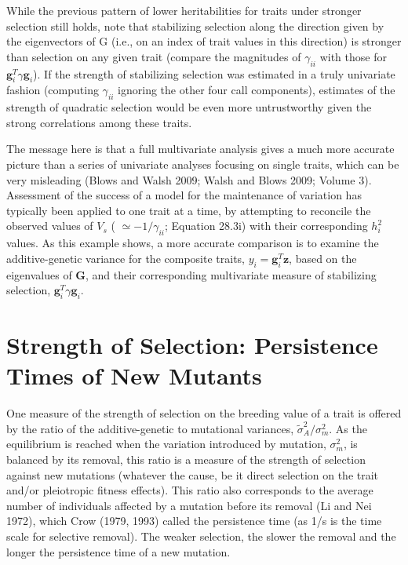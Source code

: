 \documentclass{article}
\begin{document}
While the previous pattern of lower heritabilities for traits under stronger selection still holds, note that stabilizing selection along the direction given by the eigenvectors of G (i.e., on an index of trait values in this direction) is stronger than selection on any given trait (compare the magnitudes of  $ \gamma_{ii} $ with those for  $ \mathbf{g}_i^T \gamma \mathbf{g}_i $). If the strength of stabilizing selection was estimated in a truly univariate fashion (computing  $ \gamma_{ii} $ ignoring the other four call components), estimates of the strength of quadratic selection would be even more untrustworthy given the strong correlations among these traits.

The message here is that a full multivariate analysis gives a much more accurate picture than a series of univariate analyses focusing on single traits, which can be very misleading (Blows and Walsh 2009; Walsh and Blows 2009; Volume 3). Assessment of the success of a model for the maintenance of variation has typically been applied to one trait at a time, by attempting to reconcile the observed values of  $ V_s $ ( $ \simeq -1/\gamma_{ii} $; Equation 28.3i) with their corresponding  $ h_i^2 $ values. As this example shows, a more accurate comparison is to examine the additive-genetic variance for the composite traits,  $ y_i = \mathbf{g}_i^T \mathbf{z} $, based on the eigenvalues of  $ \mathbf{G} $, and their corresponding multivariate measure of stabilizing selection,  $ \mathbf{g}_i^T \gamma \mathbf{g}_i $.

\section{Strength of Selection: Persistence Times of New Mutants}
One measure of the strength of selection on the breeding value of a trait is offered by the ratio of the additive-genetic to mutational variances,  $ \widetilde{\sigma}_{A}^{2}/\sigma_{m}^{2} $. As the equilibrium is reached when the variation introduced by mutation,  $ \sigma_{m}^{2} $, is balanced by its removal, this ratio is a measure of the strength of selection against new mutations (whatever the cause, be it direct selection on the trait and/or pleiotropic fitness effects). This ratio also corresponds to the average number of individuals affected by a mutation before its removal (Li and Nei 1972), which Crow (1979, 1993) called the persistence time (as 1/s is the time scale for selective removal). The weaker selection, the slower the removal and the longer the persistence time of a new mutation.
\end{document}
